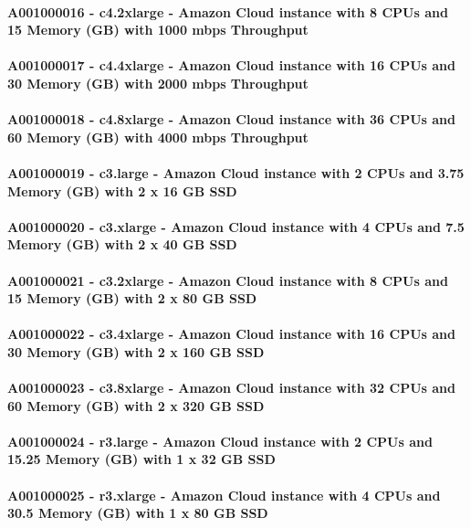 \documentclass{acm_proc_article-sp}
\begin{document}
\paragraph{A001000016 - c4.2xlarge - Amazon Cloud instance with 8 CPUs and 15 Memory (GB) with 1000 mbps Throughput}
\paragraph{A001000017 - c4.4xlarge - Amazon Cloud instance with 16 CPUs and 30 Memory (GB) with 2000 mbps Throughput}
\paragraph{A001000018 - c4.8xlarge - Amazon Cloud instance with 36 CPUs and 60 Memory (GB) with 4000 mbps Throughput}
\paragraph{A001000019 - c3.large - Amazon Cloud instance with 2 CPUs and 3.75 Memory (GB) with 2 x 16 GB SSD}
\paragraph{A001000020 - c3.xlarge - Amazon Cloud instance with 4 CPUs and 7.5 Memory (GB) with 2 x 40 GB SSD}
\paragraph{A001000021 - c3.2xlarge - Amazon Cloud instance with 8 CPUs and 15 Memory (GB) with 2 x 80 GB SSD}
\paragraph{A001000022 - c3.4xlarge - Amazon Cloud instance with 16 CPUs and 30 Memory (GB) with 2 x 160 GB SSD}
\paragraph{A001000023 - c3.8xlarge - Amazon Cloud instance with 32 CPUs and 60 Memory (GB) with 2 x 320 GB SSD}
\paragraph{A001000024 - r3.large - Amazon Cloud instance with 2 CPUs and 15.25 Memory (GB) with 1 x 32 GB SSD}
\paragraph{A001000025 - r3.xlarge - Amazon Cloud instance with 4 CPUs and 30.5 Memory (GB) with 1 x 80 GB SSD}
\end{document}
